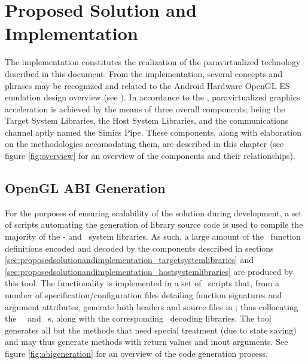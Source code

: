 
\chapter{Proposed Solution and Implementation}
\label{cha:proposedsolutionandimplementation}
The implementation constitutes the realization of the paravirtualized technology described in this document.
From the implementation, several concepts and phrases may be recognized and related to the Android Hardware OpenGL ES emulation design overview (see ).
In accordance to the \dvttermandroidemulator , paravirtualized graphics acceleration is achieved by the means of three overall components; being the Target System Libraries, the Host System Libraries, and the communications channel aptly named the Simics Pipe.
These components, along with elaboration on the methodologies accomodating them, are described in this chapter (see figure \ref{fig:overview} for an overview of the components and their relationships).

\section{OpenGL ABI Generation}
\label{sec:proposedsolutionandimplementation_openglabigeneration}
For the purposes of ensuring scalability of the solution during development, a set of scripts automating the generation of library source code is used to compile the majority of the \dvttermtarget - and \dvttermhost\ system libraries.
As such, a large amount of the \dvttermopengl\ function definitions encoded and decoded by the components described in sections \ref{sec:proposedsolutionandimplementation_targetsystemlibraries} and \ref{sec:proposedsolutionandimplementation_hostsystemlibraries} are produced by this tool.
The functionality is implemented in a set of \dvttermpython\ scripts that, from a number of specification/configuration files detailing function signatures and argument attributes, generate both headers and source files in \dvttermc ; thus collocating the \dvttermtarget\ \dvttermopengl\ and \dvttermegl\ \dvttermabi s, along with the corresponding \dvttermhost\ decoding libraries.
The tool generates all but the methods that need special treatment (due to state saving) and may thus generate methods with return values and inout arguments.
See figure \ref{fig:abigeneration} for an overview of the code generation process.

